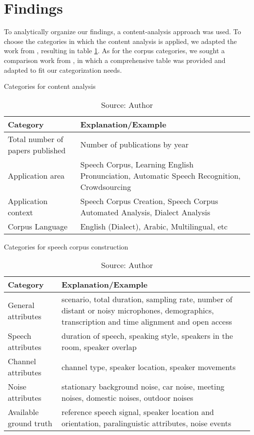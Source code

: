 \section{Findings}

To analytically organize our findings, a content-analysis approach was used. To choose the categories in which the content analysis is applied, we adapted the work from \cite{queiroz2019blockchain}, resulting in table \ref{tab:content-analysis}. As for the corpus categories, we sought a comparison work from  \cite{LeRouxVincent2014TRdatasets}, in which a comprehensive table was provided and adapted to fit our categorization needs.

\begin{table}[ht]
    \centering
    \caption{Categories for content analysis}
    \begin{tabular}{|p{4cm}|p{11cm}|}
        \hline Category & Explanation/Example \\ \hline
        Total number of papers published & Number of publications by year \\ \hline
        Application area & Speech Corpus, Learning English Pronunciation, Automatic Speech Recognition, Crowdsourcing \\ \hline
        Application context & Speech Corpus Creation, Speech Corpus Automated Analysis, Dialect Analysis \\ \hline
        Corpus Language & English (Dialect), Arabic, Multilingual, etc \\ \hline
    \end{tabular}
    \caption*{Source: Author}
    \label{tab:content-analysis}
\end{table}

\begin{table}[ht]
    \centering
    \caption{Categories for speech corpus construction}
    \begin{tabular}{|p{4cm}|p{11cm}|}
        \hline Category & Explanation/Example \\ \hline
        General attributes & scenario, total duration, sampling rate, number of distant or noisy microphones, demographics, transcription and time alignment and open access \\ \hline
        Speech attributes & duration of speech, speaking style, speakers in the room, speaker overlap\\ \hline
        Channel attributes & channel type, speaker location, speaker movements \\ \hline
        Noise attributes & stationary background noise, car noise, meeting noises, domestic noises, outdoor noises \\ \hline
        Available ground truth & reference speech signal, speaker location and orientation, paralinguistic attributes, noise events \\ \hline
    \end{tabular}
    \caption*{Source: Author}
    \label{tab:speech-analysis}
\end{table}

